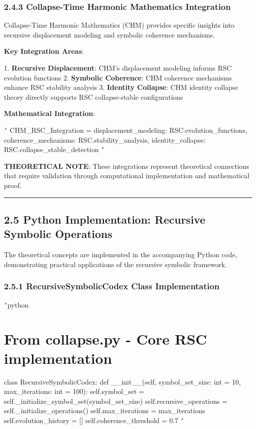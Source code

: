 \subsection{2.4.3 Collapse-Time Harmonic Mathematics Integration}

Collapse-Time Harmonic Mathematics (CHM) provides specific insights into recursive displacement modeling and symbolic coherence mechanisms.

\textbf{Key Integration Areas}:

1. \textbf{Recursive Displacement}: CHM's displacement modeling informs RSC evolution functions
2. \textbf{Symbolic Coherence}: CHM coherence mechanisms enhance RSC stability analysis
3. \textbf{Identity Collapse}: CHM identity collapse theory directly supports RSC collapse-stable configurations

\textbf{Mathematical Integration}:

\texttt{`}
CHM_RSC_Integration = {
    displacement_modeling: RSC.evolution_functions,
    coherence_mechanisms: RSC.stability_analysis,
    identity_collapse: RSC.collapse_stable_detection
}
\texttt{`}

\textbf{THEORETICAL NOTE}: These integrations represent theoretical connections that require validation through computational implementation and mathematical proof.

\hrule

\section{2.5 Python Implementation: Recursive Symbolic Operations}

The theoretical concepts are implemented in the accompanying Python code, demonstrating practical applications of the recursive symbolic framework.

\subsection{2.5.1 RecursiveSymbolicCodex Class Implementation}

\texttt{`}python
\chapter{From collapse.py - Core RSC implementation}
class RecursiveSymbolicCodex:
    def __init__(self, symbol_set_size: int = 10, max_iterations: int = 100):
        self.symbol_set = self._initialize_symbol_set(symbol_set_size)
        self.recursive_operations = self._initialize_operations()
        self.max_iterations = max_iterations
        self.evolution_history = []
        self.coherence_threshold = 0.7
\texttt{`}

